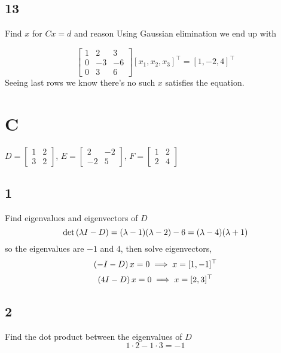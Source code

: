 \documentclass{article}
\begin{document}
\subsection*{13}
\begin{myleftlinebox}
    Find \(x\) for \(Cx=d\) and reason
    \tcblower
    Using Gaussian elimination we end up with

    \[
        \begin{bmatrix}
            1 & 2 & 3\\
            0 & -3 & -6\\
            0 & 3 & 6
        \end{bmatrix} [x_1,x_2,x_3]^\top = [1, -2,4]^\top
    \]
    Seeing last rows we know there's no such \(x\) satisfies the equation.

\end{myleftlinebox}

\section*{C}
\(
    D = \begin{bmatrix}
        1 & 2\\
        3 & 2
    \end{bmatrix}
\), \(E =\begin{bmatrix}
    2 & -2 \\
    -2 & 5
\end{bmatrix}\), \(F = \begin{bmatrix}
    1 & 2\\
    2 & 4
\end{bmatrix}\)
\subsection*{1}
\begin{myleftlinebox}
    Find eigenvalues and eigenvectors of \(D\)
    \tcblower
    \[
        \det\left( \lambda I-D  \right) = (\lambda-1)(\lambda -2)-6 = (\lambda-4)(\lambda+1)
    \]
    so the eigenvalues are \(-1\) and \(4\), then solve eigenvectors,
    \[
        \left( - I-D  \right)x = 0 \implies x = [1,-1]^\top
    \]
    \[
        \left( 4 I-D  \right)x = 0 \implies x = [2,3]^\top
    \]
\end{myleftlinebox}


\subsection*{2}
\begin{myleftlinebox}
    Find the dot product between the eigenvalues of \(D\)
    \tcblower
    \[
        1\cdot 2-1\cdot 3 = -1
    \]
\end{myleftlinebox}
\end{document}
